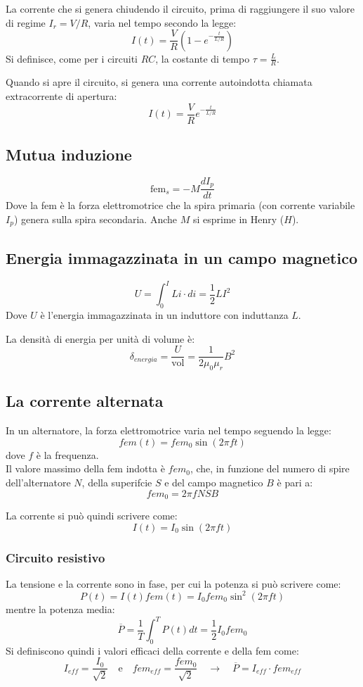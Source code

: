 \documentclass[12pt]{article}
\begin{document}
La corrente che si genera chiudendo il circuito, prima di raggiungere il suo valore di regime $I_r = V/R$, varia nel tempo secondo la legge:
$$ I(t) = \frac{V}{R}(1 - e^{-\frac{t}{L/R}}) $$
Si definisce, come per i circuiti $RC$, la costante di tempo $\tau = \frac{L}{R}$.

\vspace{1em}

Quando si apre il circuito, si genera una corrente autoindotta chiamata extracorrente di apertura:
$$ I(t) = \frac{V}{R}e^{-\frac{t}{L/R}} $$

\subsection{Mutua induzione}
$$ \text{fem}_s = -M \frac{dI_p}{dt} $$
Dove la fem è la forza elettromotrice che la spira primaria (con corrente variabile $I_p$) genera sulla spira secondaria. Anche $M$ si esprime in Henry ($H$).

\subsection{Energia immagazzinata in un campo magnetico}
$$ U = \int_0^I Li \cdot di = \frac{1}{2}LI^2 $$
Dove $U$ è l'energia immagazzinata in un induttore con induttanza $L$.

\vspace{1em}

La densità di energia per unità di volume è:
$$ \delta_{energia} = \frac{U}{\text{vol}} = \frac{1}{2\mu_0 \mu_r }B^2 $$

\subsection{La corrente alternata}
In un alternatore, la forza elettromotrice varia nel tempo seguendo la legge:
$$ fem(t) = fem_0\sin(2\pi ft) $$
dove $f$ è la frequenza. \\
Il valore massimo della fem indotta è $fem_0$, che, in funzione del numero di spire dell'alternatore $N$, della superifcie $S$ e del campo magnetico $B$ è pari a:
$$ fem_0 = 2\pi fNSB $$

La corrente si può quindi scrivere come:
$$ I(t) = I_0 \sin(2\pi ft) $$

\subsubsection{Circuito resistivo}
La tensione e la corrente sono in fase, per cui la potenza si può scrivere come:
$$ P(t) = I(t)fem(t) = I_0fem_0\sin^2{(2\pi ft)} $$
mentre la potenza media:
$$ \overline{P} = \frac{1}{T}\int_0^T P(t)dt = \frac{1}{2}I_0fem_0 $$
Si definiscono quindi i valori efficaci della corrente e della fem come:
$$ I_{eff} = \frac{I_0}{\sqrt{2}} \hspace{1em} \text{e} \hspace{1em} fem_{eff} = \frac{fem_0}{\sqrt{2}} \hspace{1em} \rightarrow \hspace{1em} \overline{P} = I_{eff}\cdot fem_{eff} $$
\end{document}
